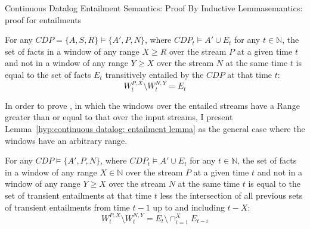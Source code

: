 \begin{nestedsection}{Continuous Datalog Entailment Semantics: Proof By Inductive Lemma}{semantics: proof for entailments}
	\begin{hyp}
		For any ${CDP = \{A,S,R\} \vDash \{A',P,N\}}$, where ${CDP_t \vDash A' \cup E_t}$ for any ${t \in \mathbb{N}}$, the set of facts in a window of any range ${X \geq R}$ over the stream $P$ at a given time ${t}$ and not in a window of any range ${Y \geq X}$ over the stream $N$ at the same time $t$ is equal to the set of facts $E_t$ transitively entailed by the ${CDP}$ at that time $t$:
		\begin{equation*}
			W^{P,X}_t \setminus W^{N,Y}_t = E_t
		\end{equation*}
	\end{hyp}
	In order to prove , in which the windows over the entailed streams have a Range greater than or equal to that over the input streams, I present Lemma~\ref{hyp:continuous datalog: entailment lemma} as the general case where the windows have an arbitrary range.
	\begin{lem}\label{hyp:continuous datalog: entailment lemma}
		For any ${CDP \vDash \{A',P,N\}}$, where ${CDP_t \vDash A' \cup E_t}$ for any ${t \in \mathbb{N}}$, the set of facts in a window of any range ${X \in \mathbb{N}}$ over the stream $P$ at a given time ${t}$ and not in a window of any range ${Y \geq X}$ over the stream $N$ at the same time $t$ is equal to the set of transient entailments at that time $t$ less the intersection of all previous sets of transient entailments from time ${t-1}$ up to and including ${t-X}$:
		\begin{equation*}
			W^{P,X}_t \setminus W^{N,Y}_t = E_t \setminus \mathop{\cap}^{X}_{i=1} E_{t-i}
		\end{equation*}
	\end{lem}


\end{nestedsection}
